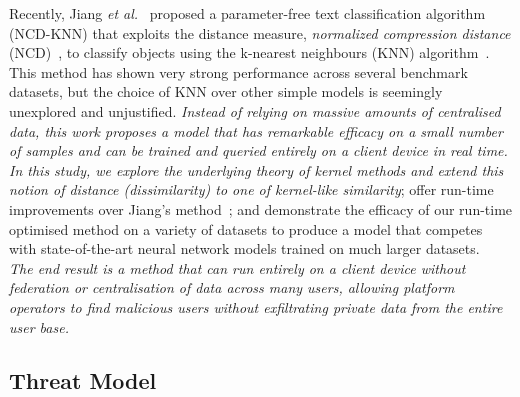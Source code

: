 \documentclass[conference]{IEEEtran}
\newcommand{\cm}[1]{\textit{{\color{blue}#1}}}
\begin{document}
Recently, Jiang \textit{et al.}~\cite{jiang2022less} proposed a parameter-free text classification algorithm (NCD-KNN) that exploits the distance measure, \textit{normalized compression distance} (NCD)~\cite{ncd},  to classify objects using the k-nearest neighbours (KNN) algorithm~\cite{shalev2014understanding}.
This method has shown very strong performance across several benchmark datasets, but the choice of KNN over other simple models is seemingly unexplored and unjustified. 
\cm{
Instead of relying on massive amounts of centralised data, this work proposes a model that has remarkable efficacy on a small number of samples and can be trained and queried entirely on a client device in real time.
In this study, we explore the underlying theory of kernel methods and extend this notion of distance (dissimilarity) to one of kernel-like similarity}; offer run-time improvements over Jiang's method~\cite{jiang2022less}; and demonstrate the efficacy of our run-time optimised method on a variety of datasets to produce a model that competes with state-of-the-art neural network models trained on much larger datasets.  ~\cm{
The end result is a method that can run entirely on a client device without federation or centralisation of data across many users, allowing platform operators to find malicious users without exfiltrating private data from the entire user base.
}




\subsection{Threat Model}
\label{threat}
\end{document}

